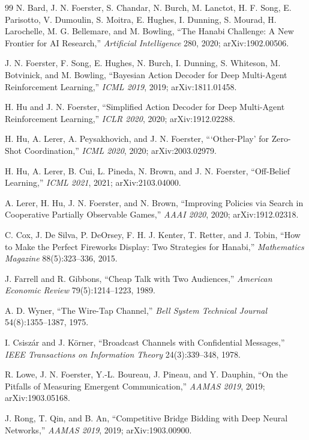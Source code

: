 \documentclass[11pt]{article}
\theoremstyle{definition}
\begin{document}
\begin{thebibliography}{99}
N. Bard, J. N. Foerster, S. Chandar, N. Burch, M. Lanctot, H. F. Song,
E. Parisotto, V. Dumoulin, S. Moitra, E. Hughes, I. Dunning, S. Mourad,
H. Larochelle, M. G. Bellemare, and M. Bowling, ``The Hanabi Challenge: A New
Frontier for AI Research,'' \emph{Artificial Intelligence} 280, 2020;
arXiv:1902.00506.

J. N. Foerster, F. Song, E. Hughes, N. Burch, I. Dunning, S. Whiteson,
M. Botvinick, and M. Bowling, ``Bayesian Action Decoder for Deep Multi-Agent
Reinforcement Learning,'' \emph{ICML 2019}, 2019; arXiv:1811.01458.

H. Hu and J. N. Foerster, ``Simplified Action Decoder for Deep Multi-Agent
Reinforcement Learning,'' \emph{ICLR 2020}, 2020; arXiv:1912.02288.

H. Hu, A. Lerer, A. Peysakhovich, and J. N. Foerster, ```Other-Play' for
Zero-Shot Coordination,'' \emph{ICML 2020}, 2020; arXiv:2003.02979.

H. Hu, A. Lerer, B. Cui, L. Pineda, N. Brown, and J. N. Foerster, ``Off-Belief
Learning,'' \emph{ICML 2021}, 2021; arXiv:2103.04000.

A. Lerer, H. Hu, J. N. Foerster, and N. Brown, ``Improving Policies via Search
in Cooperative Partially Observable Games,'' \emph{AAAI 2020}, 2020;
arXiv:1912.02318.

C. Cox, J. De Silva, P. DeOrsey, F. H. J. Kenter, T. Retter, and J. Tobin, ``How
to Make the Perfect Fireworks Display: Two Strategies for Hanabi,''
\emph{Mathematics Magazine} 88(5):323--336, 2015.

J. Farrell and R. Gibbons, ``Cheap Talk with Two Audiences,'' \emph{American
Economic Review} 79(5):1214--1223, 1989.

A. D. Wyner, ``The Wire-Tap Channel,'' \emph{Bell System Technical Journal}
54(8):1355--1387, 1975.

I. Csisz\'ar and J. K\"orner, ``Broadcast Channels with Confidential Messages,''
\emph{IEEE Transactions on Information Theory} 24(3):339--348, 1978.

R. Lowe, J. N. Foerster, Y.-L. Boureau, J. Pineau, and Y. Dauphin, ``On the
Pitfalls of Measuring Emergent Communication,'' \emph{AAMAS 2019}, 2019;
arXiv:1903.05168.

J. Rong, T. Qin, and B. An, ``Competitive Bridge Bidding with Deep Neural
Networks,'' \emph{AAMAS 2019}, 2019; arXiv:1903.00900.


\end{thebibliography}
\end{document}
